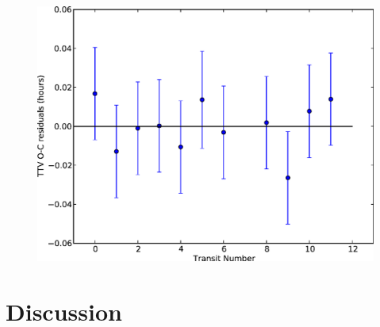 \documentclass[preprint]{emulateapj}
\begin{document}
\begin{figure}
\includegraphics[width=0.9\linewidth]{TTV.eps}
\end{figure}

\begin{figure}
\end{figure}
\section{Discussion}
\label{sec:discussion}
\end{document}
